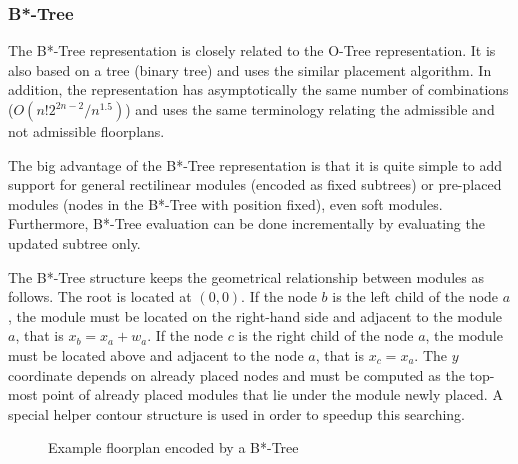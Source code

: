 \subsubsection{B*-Tree}

The B*-Tree representation \cite{btree} is closely related to the O-Tree representation. It is also based on a tree (binary tree) and uses the similar placement algorithm. In addition, the representation has asymptotically the same number of combinations ($O(n!2^{2n-2}/n^{1.5})$) and uses the same terminology relating the admissible and not admissible floorplans.

The big advantage of the B*-Tree representation is that it is quite simple to add support for general rectilinear modules (encoded as fixed subtrees) or pre-placed modules (nodes in the B*-Tree with position fixed), even soft modules. Furthermore, B*-Tree evaluation can be done incrementally by evaluating the updated subtree only.

The B*-Tree \cite{btree} structure keeps the geometrical relationship between modules as follows. The root is located at $(0, 0)$. If the node $b$ is the left child of the node $a$, the module must be located on the right-hand side and adjacent to the module $a$, that is $x_b = x_a + w_a$. If the node $c$ is the right child of the node $a$, the module must be located above and adjacent to the node $a$, that is $x_c = x_a$. The $y$ coordinate depends on already placed nodes and must be computed as the top-most point of already placed modules that lie under the module newly placed. A special helper contour structure is used in order to speedup this searching.

\begin{figure}
\centering
{} \hfill
{}
\caption{Example floorplan encoded by a B*-Tree}
\label{fig:btree}
\end{figure}
